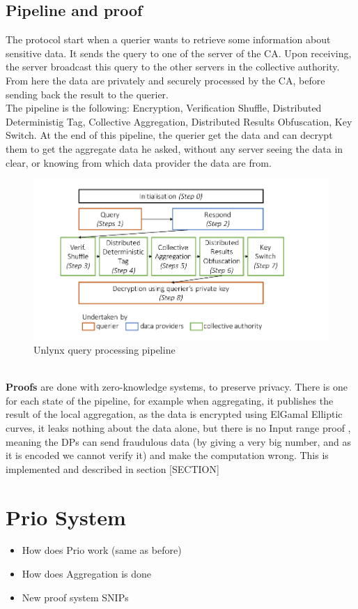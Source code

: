 \documentclass{article}
\begin{document}
\subsection{Pipeline and proof}
The protocol start when a querier wants to retrieve some information about sensitive data. It sends the query to one of the server of the CA. Upon receiving, the server broadcast this query to the other servers in the collective authority.\\
From here the data are privately and securely processed by the CA, before sending back the result to the querier.\\
The pipeline is the following: Encryption, Verification Shuffle, Distributed Deterministig Tag, Collective Aggregation, Distributed Results Obfuscation, Key Switch. At the end of this pipeline, the querier get the data and can decrypt them to get the aggregate data he asked, without any server seeing the data in clear, or knowing from which data provider the data are from.
\begin{figure}[h]
\centering
\includegraphics[scale=0.5]{img/unlynxPip.png}
\caption{Unlynx query processing pipeline}
\end{figure}
\\
\textbf{Proofs} are done with zero-knowledge systems, to preserve privacy. There is one for each state of the pipeline, for example when aggregating, it publishes the result of the local aggregation, as the data is encrypted using ElGamal Elliptic curves, it leaks nothing about the data alone, but there is no Input range proof , meaning the DPs can send fraudulous data (by giving a very big number, and as it is encoded we cannot verify it) and make the computation wrong. This is implemented and described in section [SECTION]\\

\section{Prio System}
\begin{itemize}
\item How does Prio work (same as before)
\item How does Aggregation is done
\item New proof system SNIPs
\end{itemize}
\end{document}
